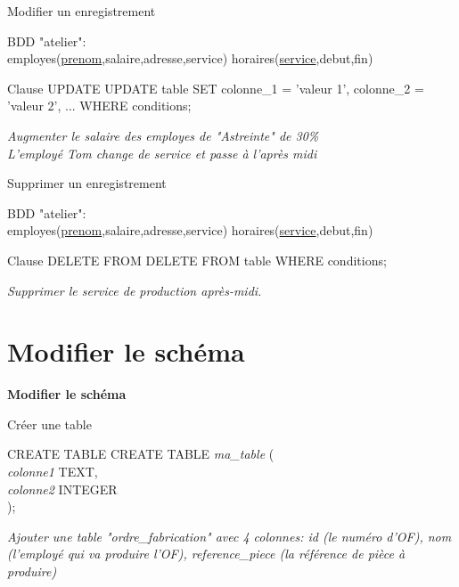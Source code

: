 \documentclass[xetex,dvipsnames]{beamer}
\begin{document}
\begin{frame}{Modifier un enregistrement}
	\begin{small}
		BDD "atelier": \\employes(\underline{prenom},salaire,adresse,service) horaires(\underline{service},debut,fin)
	\end{small}	
	\begin{alertblock}{Clause UPDATE}
		UPDATE table SET colonne\_1 = 'valeur 1', colonne\_2 = 'valeur 2', ... WHERE conditions;
	\end{alertblock}
	\textit{Augmenter le salaire des employes de "Astreinte" de 30\%}\\
	\textit{L'employé Tom change de service et passe à l'après midi }\\
\end{frame}

\begin{frame}{Supprimer un enregistrement}
	\begin{small}
		BDD "atelier": \\employes(\underline{prenom},salaire,adresse,service) horaires(\underline{service},debut,fin)
	\end{small}	
	\begin{alertblock}{Clause DELETE FROM}
		DELETE FROM table WHERE conditions;
	\end{alertblock}
	\textit{Supprimer le service de production après-midi.}\\
\end{frame}

\section{Modifier le schéma}
\begin{frame}
\begin{center}
{\LARGE \textbf{Modifier le schéma}}
\end{center}
\end{frame}

\begin{frame}{Créer une table}
	\begin{alertblock}{CREATE TABLE}
	CREATE TABLE \textit{ma\_table} (\\
    \textit{colonne1}		TEXT,\\
	\textit{colonne2}		INTEGER\\
);
	\end{alertblock}
	\textit{Ajouter une table "ordre\_fabrication" avec 4 colonnes: id (le numéro d'OF), nom (l'employé qui va produire l'OF), reference\_piece (la référence de pièce à produire)}
\end{frame}
\end{document}
